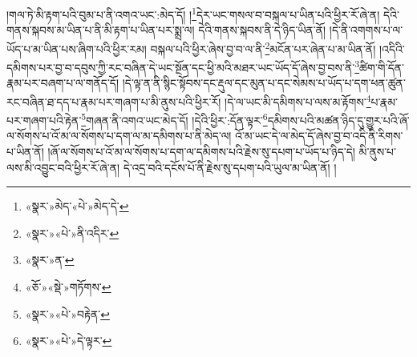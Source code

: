 །གལ་ཏེ་མི་རྟག་པའི་བུམ་པ་ནི་འགའ་ཡང་:མེད་དོ། །\footnote{«སྣར་»མེད་«པེ་»མེད་དེ་}དེར་ཡང་གསལ་བ་བསྐལ་པ་ཡིན་པའི་ཕྱིར་རོ་ཞེ་ན། དེའི་གནས་སྐབས་མ་ཡིན་པ་ནི་མི་རྟག་པ་ཡིན་པར་སྨྲ་ལ། དེའི་གནས་སྐབས་ནི་དེ་ཉིད་ཡིན་ནོ། །དེ་ནི་འགགས་པ་ལ་ཡོད་པ་མ་ཡིན་པས་ཞིག་པའི་ཕྱིར་རམ། བསྐལ་པའི་ཕྱིར་ཞེས་བྱ་བ་ལ་ནི་\footnote{«སྣར་»«པེ་»ནི་འདིར་}མངོན་པར་ཞེན་པ་མ་ཡིན་ནོ། །འདིའི་དམིགས་པར་བྱ་བ་དབུས་ཀྱི་རང་བཞིན་དེ་ཡང་སྔོན་དང་ཕྱི་མའི་མཐར་ཡང་ཡོད་དོ་ཞེས་བྱ་བས་ནི་\footnote{«སྣར་»ན་}ཚིག་གི་དོན་རྣམ་པར་བཞག་པ་ལ་གནོད་དོ། །དེ་ལྟ་ན་ནི་སྙིང་སྟོབས་དང་རྡུལ་དང་མུན་པ་དང་སེམས་པ་ཡོད་པ་དག་ཕན་ཚུན་རང་བཞིན་ཐ་དད་པ་རྣམ་པར་གཞག་པ་མི་ནུས་པའི་ཕྱིར་རོ། །དེ་ལ་ཡང་མི་དམིགས་པ་ལས་མ་རྟོགས་\footnote{«ཅོ་»«སྡེ་»གཏོགས་}པ་རྣམ་པར་གཞག་པའི་རྟེན་\footnote{«སྣར་»«པེ་»བརྟེན་}གཞན་ནི་འགའ་ཡང་མེད་དོ། །དེའི་ཕྱིར་:དོན་ལྟར་\footnote{«སྣར་»«པེ་»དེ་ལྟར་}དམིགས་པའི་མཚན་ཉིད་དུ་གྱུར་པའི་ཞོ་ལ་སོགས་པ་འོ་མ་ལ་སོགས་པ་དག་ལ་མ་དམིགས་པ་ནི་མེད་ལ། འོ་མ་ཡང་དེ་ལ་མེད་དོ་ཞེས་བྱ་བ་འདི་ནི་རིགས་པ་ཡིན་ནོ། །ཞོ་ལ་སོགས་པ་འོ་མ་ལ་སོགས་པ་དག་ལ་དམིགས་པའི་རྗེས་སུ་དཔག་པ་ཡོད་པ་ཉིད་དེ། མི་ནུས་པ་ལས་མི་འབྱུང་བའི་ཕྱིར་རོ་ཞེ་ན། དེ་འདྲ་བའི་དངོས་པོ་ནི་རྗེས་སུ་དཔག་པའི་ཡུལ་མ་ཡིན་ནོ། །
